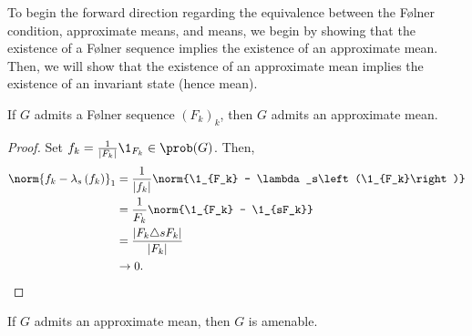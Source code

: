 To begin the forward direction regarding the equivalence between the Følner condition, approximate means, and means, we begin by showing that the existence of a Følner sequence implies the existence of an approximate mean. Then, we will show that the existence of an approximate mean implies the existence of an invariant state (hence mean).
\begin{proposition}\label{prop:folner_implies_approx_mean}
  If $G$ admits a Følner sequence $\left(F_k\right)_k$, then $G$ admits an approximate mean.
\end{proposition}
\begin{proof}
  Set $f_k = \frac{1}{\left\vert F_k \right\vert}\1_{F_k}\in \prob(G)$. Then,
  \begin{align*}
    \norm{f_k - \lambda_s\left(f_k\right)}_{1} &= \frac{1}{\left\vert f_k \right\vert} \norm{\1_{F_k} - \lambda_s\left(\1_{F_k}\right)}\\
                                               &= \frac{1}{F_k}\norm{\1_{F_k} - \1_{sF_k}}\\
                                               &= \frac{\left\vert F_k\triangle sF_k \right\vert}{\left\vert F_k \right\vert}\\
                                               &\rightarrow 0.
  \end{align*}
\end{proof}
\begin{proposition}\label{prop:approx_mean_implies_amenable}
  If $G$ admits an approximate mean, then $G$ is amenable.
\end{proposition}
